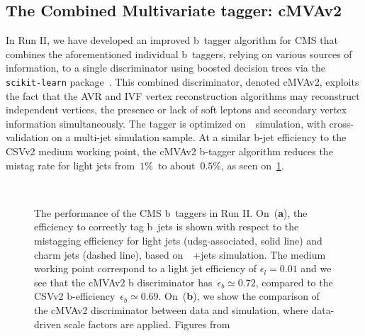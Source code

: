 \subsection{The Combined Multivariate tagger: cMVAv2}
In Run II, we have developed an improved b~tagger algorithm for CMS that combines the aforementioned individual b~taggers, relying on various sources of information, to a single discriminator using boosted decision trees via the \texttt{scikit-learn} package~\cite{scikit-learn}. This combined discriminator, denoted cMVAv2, exploits the fact that the AVR and IVF vertex reconstruction algorithms may reconstruct independent vertices, the presence or lack of soft leptons and secondary vertex information simultaneously. The tagger is optimized on~\ttbar~simulation, with cross-validation on a multi-jet simulation sample. At a similar b-jet efficiency to the CSVv2 medium working point, the cMVAv2 b-tagger algorithm reduces the mistag rate for light jets from~$1\%$~to about~$0.5\%$, as seen on~\cref{fig:btag_roc}.

\begin{figure}
\begin{centering}
 \\
\caption{The performance of the CMS b~taggers in Run II. On~(\textbf{a}), the efficiency to correctly tag b~jets is shown with respect to the mistagging efficiency for light jets (udsg-associated, solid line) and charm jets (dashed line), based on~\ttbar~+jets simulation. The medium working point correspond to a light jet efficiency of $\epsilon_{l} = 0.01$ and we see that the cMVAv2 b discriminator has~$\epsilon_{b} \simeq 0.72$, compared to the CSVv2 b-efficiency~$\epsilon_{b} \simeq 0.69$. On~(\textbf{b}), we show the comparison of the cMVAv2 discriminator between data and simulation, where data-driven scale factors are applied. Figures from~\cite{CMS-PAS-BTV-15-001}}
\label{fig:btag_roc}
\end{centering}
\end{figure}

